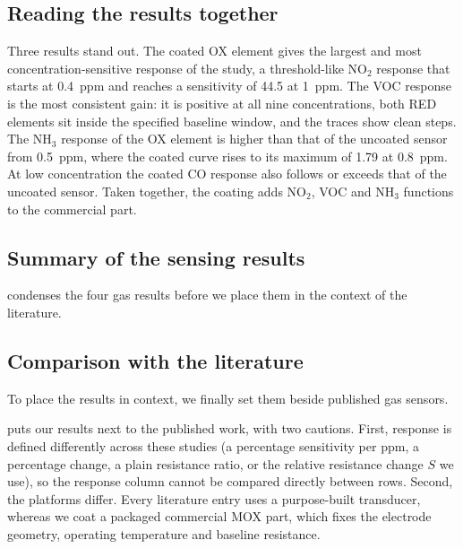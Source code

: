 \documentclass[preprint,11pt]{elsarticle}
\begin{document}
\subsection{Reading the results together}
\label{sec:discussion}
Three results stand out. The coated OX element gives the largest and most concentration-sensitive response of the study, a threshold-like NO$_2$ response that starts at 0.4~ppm and reaches a sensitivity of 44.5 at 1~ppm. The VOC response is the most consistent gain: it is positive at all nine concentrations, both RED elements sit inside the specified baseline window, and the traces show clean steps. The NH$_3$ response of the OX element is higher than that of the uncoated sensor from 0.5~ppm, where the coated curve rises to its maximum of 1.79 at 0.8~ppm. At low concentration the coated CO response also follows or exceeds that of the uncoated sensor. Taken together, the coating adds NO$_2$, VOC and NH$_3$ functions to the commercial part.

\subsection{Summary of the sensing results}
\label{sec:summary}
 condenses the four gas results before we place them in the context of the literature.



\subsection{Comparison with the literature}
\label{sec:comparison}
To place the results in context, we finally set them beside published gas sensors.

 puts our results next to the published work, with two cautions. First, response is defined differently across these studies (a percentage sensitivity per ppm, a percentage change, a plain resistance ratio, or the relative resistance change $S$ we use), so the response column cannot be compared directly between rows. Second, the platforms differ. Every literature entry uses a purpose-built transducer, whereas we coat a packaged commercial MOX part, which fixes the electrode geometry, operating temperature and baseline resistance.


\end{document}

